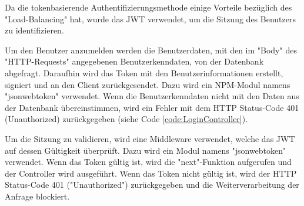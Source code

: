 
Da die tokenbasierende Authentifizierungsmethode einige Vorteile bezüglich des "Load-Balancing" hat, wurde das JWT verwendet, um die Sitzung des Benutzers zu identifizieren.


Um den Benutzer anzumelden werden die Benutzerdaten, mit den im "Body" \linebreak des "HTTP-Requests" angegebenen Benutzerkenndaten, von der Datenbank abgefragt. 
Daraufhin wird das Token mit den Benutzerinformationen erstellt, signiert und an den Client zurückgesendet. Dazu wird ein NPM-Modul namens "jsonwebtoken" verwendet. \cite{NpmJWT} 
Wenn die Benutzerkenndaten nicht mit den Daten aus der Datenbank übereinstimmen, wird ein Fehler mit dem HTTP Status-Code 401 (Unauthorized) zurückgegeben (siehe Code \ref{code:LoginController}).


\pagebreak
{}

Um die Sitzung zu validieren, wird eine Middleware verwendet, welche das JWT auf dessen Gültigkeit überprüft. Dazu wird ein Modul namens "jsonwebtoken" verwendet. \cite{NpmJWT} 
Wenn das Token gültig ist, wird die "next"-Funktion aufgerufen und der Controller wird ausgeführt. 
Wenn das Token nicht gültig ist, wird der HTTP Status-Code 401 ("Unauthorized") zurückgegeben und die Weiterverarbeitung der Anfrage blockiert.

